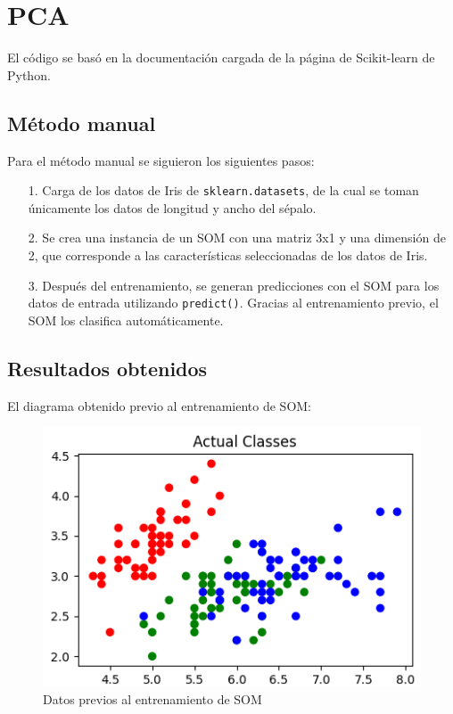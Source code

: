 \section[PCA]{PCA}
El código se basó en la documentación cargada de la página de Scikit-learn de Python.

\subsection[Manual]{Método manual}
Para el método manual se siguieron los siguientes pasos:
\begin{itemize}
    \item[1.] Carga de los datos de Iris de \texttt{sklearn.datasets}, de la cual se toman únicamente los datos de longitud y ancho del sépalo.
    \item[2.] Se crea una instancia de un SOM con una matriz 3x1 y una dimensión de 2, que corresponde a las características seleccionadas de los datos de Iris.
    \item[3.] Después del entrenamiento, se generan predicciones con el SOM para los datos de entrada utilizando \texttt{predict()}. Gracias al entrenamiento previo, el SOM los clasifica automáticamente.
\end{itemize}

\subsection[Resultados]{Resultados obtenidos}

El diagrama obtenido previo al entrenamiento de SOM:

\begin{center}
    \begin{figure}[!ht]
        \centering
        \includegraphics[scale=0.67]{Previo_SOM.png}
        \caption{Datos previos al entrenamiento de SOM}
    \end{figure}
\end{center}

